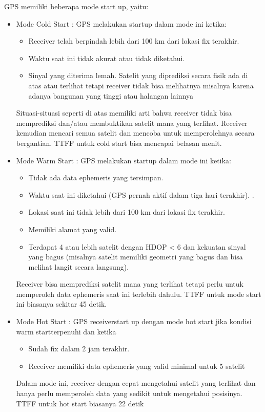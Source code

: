 GPS memiliki beberapa mode start up, yaitu: 
\begin{itemize}
	\item Mode Cold Start  : GPS melakukan startup dalam mode ini ketika: 
	\begin{itemize}
		\item Receiver telah berpindah lebih dari 100 km dari lokasi fix terakhir. 
		\item Waktu saat ini tidak akurat atau tidak diketahui. 
		\item Sinyal yang diterima lemah. Satelit yang diprediksi secara fisik ada di atas atau terlihat tetapi receiver tidak bisa melihatnya misalnya karena adanya bangunan yang tinggi atau halangan lainnya
	\end{itemize}
Situasi-situasi seperti di atas memiliki arti bahwa receiver tidak bisa memprediksi dan/atau membuktikan satelit mana yang terlihat. Receiver kemudian mencari semua satelit dan mencoba untuk memperolehnya secara bergantian. TTFF untuk cold start bisa mencapai belasan menit.
	\item Mode Warm Start : GPS melakukan startup dalam mode ini ketika: 
	\begin{itemize}
		\item Tidak ada data ephemeris yang tersimpan.
		\item Waktu saat ini diketahui (GPS pernah aktif dalam tiga hari terakhir). . 
		\item Lokasi saat ini tidak lebih dari 100 km dari lokasi fix terakhir.
		\item Memiliki alamat yang valid. 
		\item Terdapat 4 atau lebih satelit dengan HDOP < 6 dan kekuatan sinyal yang bagus (misalnya satelit memiliki geometri yang bagus dan bisa melihat langit secara langsung). 
	\end{itemize}
Receiver bisa memprediksi satelit mana yang terlihat tetapi perlu untuk memperoleh data ephemeris saat ini terlebih dahulu. TTFF untuk mode start ini biasanya sekitar 45 detik.
	\item Mode Hot Start : GPS receiverstart up dengan mode hot start jika kondisi warm startterpenuhi dan ketika
	\begin{itemize}
		\item Sudah fix dalam 2 jam terakhir.
		\item Receiver memiliki data ephemeris yang valid minimal untuk 5 satelit 
	\end{itemize}
Dalam mode ini, receiver dengan cepat mengetahui satelit yang terlihat dan hanya perlu memperoleh data yang sedikit untuk mengetahui posisinya. TTFF untuk hot start biasanya 22 detik


\end{itemize}
